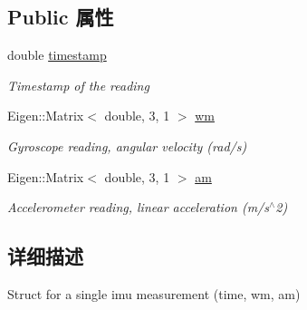 \subsection*{Public 属性}
\begin{DoxyCompactItemize}
\item 
\mbox{\label{structov__core_1_1ImuData_a530e14b091b762a7690a2acf5c826929}} 
double \hyperlink{structov__core_1_1ImuData_a530e14b091b762a7690a2acf5c826929}{timestamp}
\begin{DoxyCompactList}\small\item\em Timestamp of the reading \end{DoxyCompactList}\item 
\mbox{\label{structov__core_1_1ImuData_aee11312b7789dd0465dded1174eb6cf3}} 
Eigen\+::\+Matrix$<$ double, 3, 1 $>$ \hyperlink{structov__core_1_1ImuData_aee11312b7789dd0465dded1174eb6cf3}{wm}
\begin{DoxyCompactList}\small\item\em Gyroscope reading, angular velocity (rad/s) \end{DoxyCompactList}\item 
\mbox{\label{structov__core_1_1ImuData_a6053ffa1918f271ac0342647df25c5f4}} 
Eigen\+::\+Matrix$<$ double, 3, 1 $>$ \hyperlink{structov__core_1_1ImuData_a6053ffa1918f271ac0342647df25c5f4}{am}
\begin{DoxyCompactList}\small\item\em Accelerometer reading, linear acceleration (m/s$^\wedge$2) \end{DoxyCompactList}\end{DoxyCompactItemize}


\subsection{详细描述}
Struct for a single imu measurement (time, wm, am) 